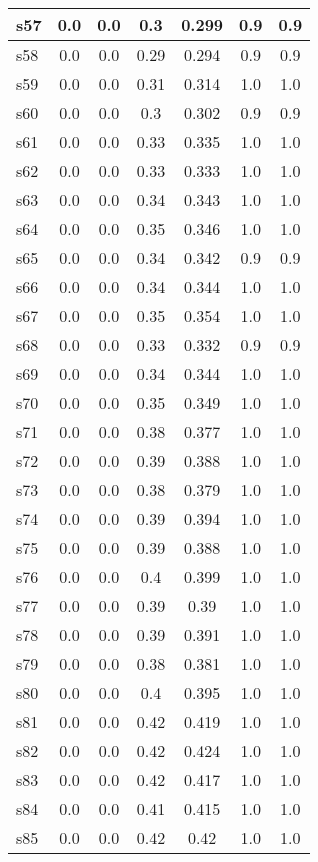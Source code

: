 \documentclass{article}
\begin{document}
\begin{tabular}{|l|c|c|c|c|c|c|}
\hline
s57 &0.0 & 0.0 & 0.3 & 0.299 & 0.9 & 0.9\\
\hline
s58 &0.0 & 0.0 & 0.29 & 0.294 & 0.9 & 0.9\\
\hline
s59 &0.0 & 0.0 & 0.31 & 0.314 & 1.0 & 1.0\\
\hline
s60 &0.0 & 0.0 & 0.3 & 0.302 & 0.9 & 0.9\\
\hline
s61 &0.0 & 0.0 & 0.33 & 0.335 & 1.0 & 1.0\\
\hline
s62 &0.0 & 0.0 & 0.33 & 0.333 & 1.0 & 1.0\\
\hline
s63 &0.0 & 0.0 & 0.34 & 0.343 & 1.0 & 1.0\\
\hline
s64 &0.0 & 0.0 & 0.35 & 0.346 & 1.0 & 1.0\\
\hline
s65 &0.0 & 0.0 & 0.34 & 0.342 & 0.9 & 0.9\\
\hline
s66 &0.0 & 0.0 & 0.34 & 0.344 & 1.0 & 1.0\\
\hline
s67 &0.0 & 0.0 & 0.35 & 0.354 & 1.0 & 1.0\\
\hline
s68 &0.0 & 0.0 & 0.33 & 0.332 & 0.9 & 0.9\\
\hline
s69 &0.0 & 0.0 & 0.34 & 0.344 & 1.0 & 1.0\\
\hline
s70 &0.0 & 0.0 & 0.35 & 0.349 & 1.0 & 1.0\\
\hline
s71 &0.0 & 0.0 & 0.38 & 0.377 & 1.0 & 1.0\\
\hline
s72 &0.0 & 0.0 & 0.39 & 0.388 & 1.0 & 1.0\\
\hline
s73 &0.0 & 0.0 & 0.38 & 0.379 & 1.0 & 1.0\\
\hline
s74 &0.0 & 0.0 & 0.39 & 0.394 & 1.0 & 1.0\\
\hline
s75 &0.0 & 0.0 & 0.39 & 0.388 & 1.0 & 1.0\\
\hline
s76 &0.0 & 0.0 & 0.4 & 0.399 & 1.0 & 1.0\\
\hline
s77 &0.0 & 0.0 & 0.39 & 0.39 & 1.0 & 1.0\\
\hline
s78 &0.0 & 0.0 & 0.39 & 0.391 & 1.0 & 1.0\\
\hline
s79 &0.0 & 0.0 & 0.38 & 0.381 & 1.0 & 1.0\\
\hline
s80 &0.0 & 0.0 & 0.4 & 0.395 & 1.0 & 1.0\\
\hline
s81 &0.0 & 0.0 & 0.42 & 0.419 & 1.0 & 1.0\\
\hline
s82 &0.0 & 0.0 & 0.42 & 0.424 & 1.0 & 1.0\\
\hline
s83 &0.0 & 0.0 & 0.42 & 0.417 & 1.0 & 1.0\\
\hline
s84 &0.0 & 0.0 & 0.41 & 0.415 & 1.0 & 1.0\\
\hline
s85 &0.0 & 0.0 & 0.42 & 0.42 & 1.0 & 1.0\\

\end{tabular}
\end{document}
